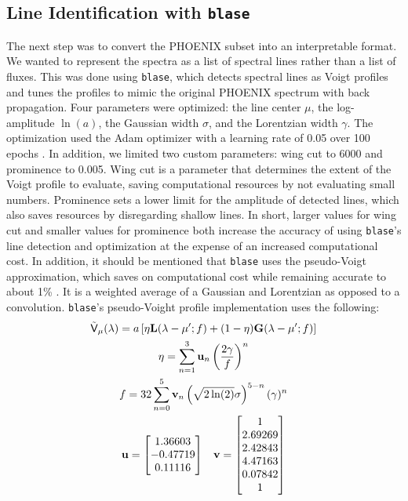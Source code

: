 \documentclass[twocolumn]{aastex631}
\begin{document}
\subsection{Line Identification with \texttt{blase}}
The next step was to convert the PHOENIX subset into an interpretable format.
We wanted to represent the spectra as a list of spectral lines rather than a
list of fluxes. This was done using \texttt{blase}, which detects spectral 
lines as Voigt profiles and tunes the profiles to mimic the original 
PHOENIX spectrum with back propagation. Four parameters were optimized: the 
line center $\mu$, the log-amplitude $\ln(a)$, the Gaussian width $\sigma$, and the 
Lorentzian width $\gamma$. The optimization used the Adam optimizer with a
learning rate of 0.05 over 100 epochs \citep{adam}. In addition, we limited two custom 
parameters: wing cut to 6000 and prominence to 0.005. Wing cut is a parameter
that determines the extent of the Voigt profile to evaluate, saving
computational resources by not evaluating small numbers. Prominence sets a
lower limit for the amplitude of detected lines, which also saves resources 
by disregarding shallow lines. In short, larger values for wing cut and 
smaller values for prominence both increase the accuracy of using
\texttt{blase}'s line detection and optimization at the expense of an
increased computational cost. In addition, it should be mentioned that
\texttt{blase} uses the pseudo-Voigt approximation, which saves on 
computational cost while remaining accurate to about 1\% \citep{pseudovoigt1, pseudovoigt2}. It is a 
weighted average of a Gaussian and Lorentzian as opposed to a convolution.
\texttt{blase}'s pseudo-Voight profile implementation uses the following:
\begin{subequations}
\begin{gather}
    \tilde{\mathsf{V}}_\mu(\lambda) = a\left[\eta \mathbf{L}(\lambda - \mu'; f) + (1 - \eta)\mathbf{G}(\lambda - \mu'; f)\right]\\
    \eta = \sum_{n=1}^3 \mathbf{u}_n\left(\dfrac{2\gamma}{f}\right)^n\\
    f = 32\sum_{n=0}^5 \mathbf{v}_n \left(\sqrt{2\ln(2)}\sigma\right)^{5-n}(\gamma)^n\\
    \nonumber \mathbf{u} = \mqty[1.36603 \\ -0.47719 \\ 0.11116] \quad \mathbf{v} = \mqty[1 \\ 2.69269 \\ 2.42843 \\ 4.47163 \\ 0.07842 \\ 1]
\end{gather}
\end{subequations}
\end{document}
